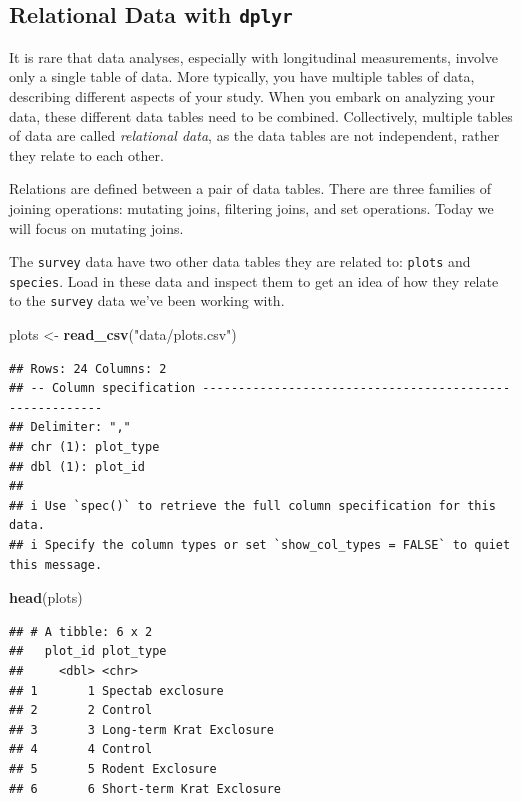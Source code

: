 \documentclass[
  10pt,
  letterpaper,
  twoside,
  openright]{book}
\newenvironment{Shaded}{\begin{snugshade}}{\end{snugshade}}
\newcommand{\FunctionTok}[1]{\textcolor[rgb]{0.13,0.29,0.53}{\textbf{#1}}}
\newcommand{\NormalTok}[1]{#1}
\newcommand{\OtherTok}[1]{\textcolor[rgb]{0.56,0.35,0.01}{#1}}
\newcommand{\StringTok}[1]{\textcolor[rgb]{0.31,0.60,0.02}{#1}}
\begin{document}
\hypertarget{relational-data-with-dplyr}{%
\subsection{\texorpdfstring{Relational Data with
\texttt{dplyr}}{Relational Data with dplyr}}\label{relational-data-with-dplyr}}

It is rare that data analyses, especially with longitudinal
measurements, involve only a single table of data. More typically, you
have multiple tables of data, describing different aspects of your
study. When you embark on analyzing your data, these different data
tables need to be combined. Collectively, multiple tables of data are
called \emph{relational data}, as the data tables are not independent,
rather they relate to each other.

Relations are defined between a pair of data tables. There are three
families of joining operations: mutating joins, filtering joins, and set
operations. Today we will focus on mutating joins.

The \texttt{survey} data have two other data tables they are related to:
\texttt{plots} and \texttt{species}. Load in these data and inspect them
to get an idea of how they relate to the \texttt{survey} data we've been
working with.

\begin{Shaded}
\begin{Highlighting}[]
\NormalTok{plots }\OtherTok{\textless{}{-}} \FunctionTok{read\_csv}\NormalTok{(}\StringTok{"data/plots.csv"}\NormalTok{)}
\end{Highlighting}
\end{Shaded}

\begin{verbatim}
## Rows: 24 Columns: 2
## -- Column specification --------------------------------------------------------
## Delimiter: ","
## chr (1): plot_type
## dbl (1): plot_id
## 
## i Use `spec()` to retrieve the full column specification for this data.
## i Specify the column types or set `show_col_types = FALSE` to quiet this message.
\end{verbatim}

\begin{Shaded}
\begin{Highlighting}[]
\FunctionTok{head}\NormalTok{(plots)}
\end{Highlighting}
\end{Shaded}

\begin{verbatim}
## # A tibble: 6 x 2
##   plot_id plot_type                
##     <dbl> <chr>                    
## 1       1 Spectab exclosure        
## 2       2 Control                  
## 3       3 Long-term Krat Exclosure 
## 4       4 Control                  
## 5       5 Rodent Exclosure         
## 6       6 Short-term Krat Exclosure
\end{verbatim}
\end{document}
